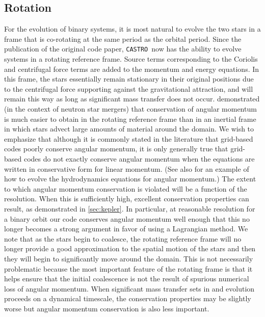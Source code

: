 \documentclass[iop]{../emulateapj}
\newcommand{\castro}{\texttt{CASTRO}}
\begin{document}
\subsection{Rotation}\label{sec:rotation}

For the evolution of binary systems, it is most natural to evolve the
two stars in a frame that is co-rotating at the same period as the
orbital period. Since the publication of the original code paper, \castro\ 
now has the ability to evolve systems in a rotating reference frame. 
Source terms corresponding to the Coriolis and centrifugal 
force terms are added to the momentum and energy equations. In this frame, 
the stars essentially remain stationary in their original positions due to the
centrifugal force supporting against the gravitational attraction, and
will remain this way as long as significant mass transfer does not
occur. \cite{swc:2000} demonstrated (in the context of neutron star
mergers) that conservation of angular momentum is much easier to
obtain in the rotating reference frame than in an inertial frame in
which stars advect large amounts of material around the domain. We
wish to emphasize that although it is commonly stated in the
literature that grid-based codes poorly conserve angular momentum,
it is only generally true that grid-based codes do not exactly conserve 
angular momentum when the equations are written in conservative form
for linear momentum. (See also \cite{motl:2002} for an example of how 
to evolve the hydrodynamics equations for angular momentum.) 
The extent to which angular momentum conservation is violated
will be a function of the resolution. When this is sufficiently high, 
excellent conservation properties can result, as demonstrated in \autoref{sec:kepler}. 
In particular, at reasonable resolution for a binary orbit our code 
conserves angular momentum well enough that this no longer becomes 
a strong argument in favor of using a Lagrangian method.
We note that as the stars begin to coalesce, the rotating reference frame
will no longer provide a good approximation to the spatial motion of
the stars and then they will begin to significantly move around the
domain. This is not necessarily problematic because the most important
feature of the rotating frame is that it helps ensure that the initial
coalescence is not the result of spurious numerical loss of angular
momentum. When significant mass transfer sets in and evolution
proceeds on a dynamical timescale, the conservation properties may be
slightly worse but angular momentum conservation is also less
important.
\end{document}
